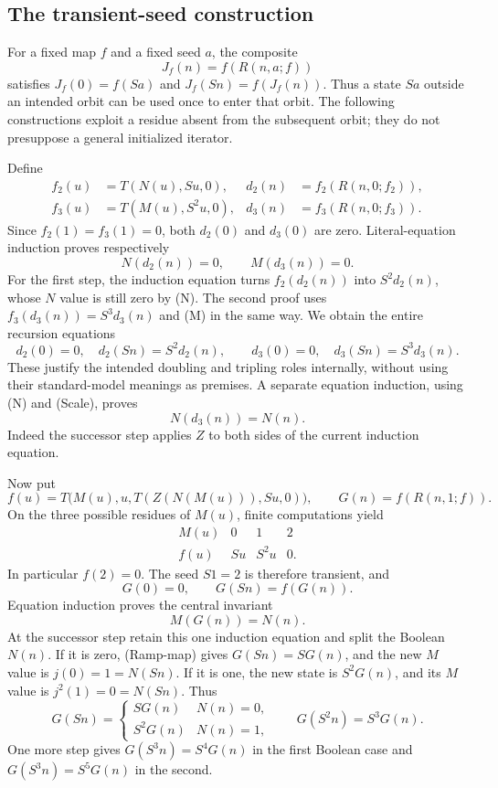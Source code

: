 \subsection{The transient-seed construction}

For a fixed map $f$ and a fixed seed $a$, the composite
\[
                       J_f(n)=f(R(n,a;f))
\]
satisfies $J_f(0)=f(Sa)$ and $J_f(Sn)=f(J_f(n))$. Thus a state $Sa$
outside an intended orbit can be used once to enter that orbit. The
following constructions exploit a residue absent from the subsequent
orbit; they do not presuppose a general initialized iterator.

Define
\begin{align*}
 f_2(u)&=T(N(u),Su,0),&
 d_2(n)&=f_2(R(n,0;f_2)),\\
 f_3(u)&=T(M(u),S^2u,0),&
 d_3(n)&=f_3(R(n,0;f_3)).
\end{align*}
Since $f_2(1)=f_3(1)=0$, both $d_2(0)$ and $d_3(0)$ are zero.
Literal-equation induction proves respectively
\[
                     N(d_2(n))=0,\qquad M(d_3(n))=0.
\]
For the first step, the induction equation turns $f_2(d_2(n))$ into
$S^2d_2(n)$, whose $N$ value is still zero by (N). The second proof
uses $f_3(d_3(n))=S^3d_3(n)$ and (M) in the same way. We obtain the
entire recursion equations
\[
 d_2(0)=0,\quad d_2(Sn)=S^2d_2(n),\qquad
 d_3(0)=0,\quad d_3(Sn)=S^3d_3(n).                  \tag{Scale}
\]
These justify the intended doubling and tripling roles internally,
without using their standard-model meanings as premises. A separate
equation induction, using (N) and (Scale), proves
\[
                              N(d_3(n))=N(n).       \tag{Parity-scale}
\]
Indeed the successor step applies $Z$ to both sides of the current
induction equation.

Now put
\[
 f(u)=T\bigl(M(u),u,T(Z(N(M(u))),Su,0)\bigr),\qquad
 G(n)=f(R(n,1;f)).
\]
On the three possible residues of $M(u)$, finite computations yield
\[
 \begin{array}{c|ccc}
 M(u)&0&1&2\\ \hline
 f(u)&Su&S^2u&0.
 \end{array}                                                        \tag{Ramp-map}
\]
In particular $f(2)=0$. The seed $S1=2$ is therefore transient, and
\[
                         G(0)=0,\qquad G(Sn)=f(G(n)).
\]
Equation induction proves the central invariant
\[
                              M(G(n))=N(n).          \tag{Ramp-invariant}
\]
At the successor step retain this one induction equation and split the
Boolean $N(n)$. If it is zero, (Ramp-map) gives $G(Sn)=SG(n)$, and
the new $M$ value is $j(0)=1=N(Sn)$. If it is one, the new state is
$S^2G(n)$, and its $M$ value is $j^2(1)=0=N(Sn)$.
Thus
\[
 G(Sn)=
 \begin{cases}SG(n)&N(n)=0,\\S^2G(n)&N(n)=1,\end{cases}\qquad
 G(S^2n)=S^3G(n).                                    \tag{Ramp-step}
\]
One more step gives $G(S^3n)=S^4G(n)$ in the first Boolean case and
$G(S^3n)=S^5G(n)$ in the second.

